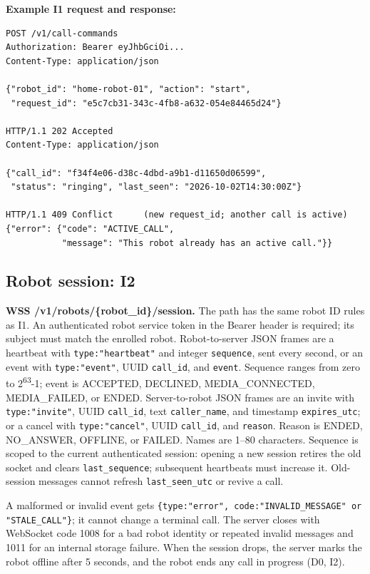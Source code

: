 \documentclass[12pt,letterpaper]{article}
\newcommand{\field}[1]{\texttt{#1}}
\begin{document}
\begin{minipage}{\linewidth}
\textbf{Example I1 request and response:}
\begin{Verbatim}[fontfamily=tt,fontsize=\small]
POST /v1/call-commands
Authorization: Bearer eyJhbGciOi...
Content-Type: application/json

{"robot_id": "home-robot-01", "action": "start",
 "request_id": "e5c7cb31-343c-4fb8-a632-054e84465d24"}

HTTP/1.1 202 Accepted
Content-Type: application/json

{"call_id": "f34f4e06-d38c-4dbd-a9b1-d11650d06599",
 "status": "ringing", "last_seen": "2026-10-02T14:30:00Z"}

HTTP/1.1 409 Conflict      (new request_id; another call is active)
{"error": {"code": "ACTIVE_CALL",
           "message": "This robot already has an active call."}}
\end{Verbatim}
\end{minipage}

\subsection*{Robot session: I2}

\textbf{WSS /v1/robots/\{robot\_id\}/session.} The path has the same robot ID rules as I1. An authenticated robot service token in the Bearer header is required; its subject must match the enrolled robot. Robot-to-server JSON frames are a heartbeat with \field{type:"heartbeat"} and integer \field{sequence}, sent every second, or an event with \field{type:"event"}, UUID \field{call\_id}, and \field{event}. Sequence ranges from zero to 2\textsuperscript{63}-1; event is ACCEPTED, DECLINED, MEDIA\_CONNECTED, MEDIA\_FAILED, or ENDED. Server-to-robot JSON frames are an invite with \field{type:"invite"}, UUID \field{call\_id}, text \field{caller\_name}, and timestamp \field{expires\_utc}; or a cancel with \field{type:"cancel"}, UUID \field{call\_id}, and \field{reason}. Reason is ENDED, NO\_ANSWER, OFFLINE, or FAILED. Names are 1--80 characters. Sequence is scoped to the current authenticated session: opening a new session retires the old socket and clears \field{last\_sequence}; subsequent heartbeats must increase it. Old-session messages cannot refresh \field{last\_seen\_utc} or revive a call.

A malformed or invalid event gets \field{\{type:"error", code:"INVALID\_MESSAGE" or "STALE\_CALL"\}}; it cannot change a terminal call. The server closes with WebSocket code 1008 for a bad robot identity or repeated invalid messages and 1011 for an internal storage failure. When the session drops, the server marks the robot offline after 5 seconds, and the robot ends any call in progress (D0, I2).
\end{document}
